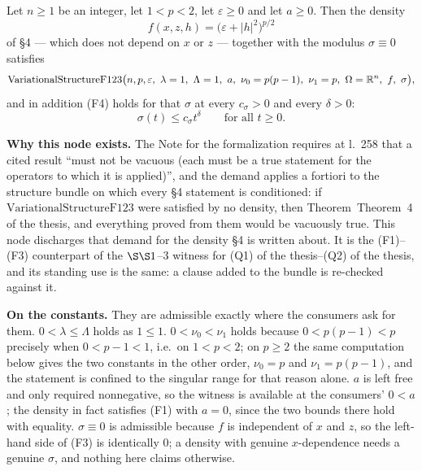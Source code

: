 \begin{lemma}
Let $n\ge1$ be an integer, let $1<p<2$, let $\varepsilon\ge0$ and let $a\ge0$.
Then the density
\[
f(x,z,h)=\bigl(\varepsilon+|h|^2\bigr)^{p/2}
\]
of \S4 --- which does not depend on $x$ or $z$ --- together with the modulus
$\sigma\equiv0$ satisfies
\[
\mathrm{VariationalStructureF123}\bigl(n,p,\varepsilon,\ \lambda=1,\
\Lambda=1,\ a,\ \nu_0=p(p-1),\ \nu_1=p,\ \Omega=\R^n,\ f,\ \sigma\bigr),
\]
and in addition (F4) holds for that $\sigma$ at every $c_\sigma>0$ and every
$\delta>0$:
\[
\sigma(t)\le c_\sigma t^\delta\qquad\text{for all }t\ge0 .
\]

\noindent\textbf{Why this node exists.}  The Note for the formalization requires
at l.~258 that a cited result ``must not be vacuous (each must be a true
statement for the operators to which it is applied)'', and the demand applies a
fortiori to the structure bundle on which every \S4 statement is conditioned: if
$\mathrm{VariationalStructureF123}$ were satisfied by no density, then
Theorem~Theorem~4 of the thesis, \noderef{MinimumGradientHolder} and everything proved from
them would be vacuously true.  This node discharges that demand for the density
\S4 is written about.  It is the (F1)--(F3) counterpart of the $\S\S1$--3
witness for (Q1) of the thesis--(Q2) of the thesis, and its standing use is the same: a
clause added to the bundle is re-checked against it.

\textbf{On the constants.}  They are admissible exactly where the consumers ask
for them.  $0<\lambda\le\Lambda$ holds as $1\le1$.  $0<\nu_0<\nu_1$ holds
because $0<p(p-1)<p$ precisely when $0<p-1<1$, i.e.\ on $1<p<2$; on $p\ge2$ the
same computation below gives the two constants in the other order, $\nu_0=p$ and
$\nu_1=p(p-1)$, and the statement is confined to the singular range for that
reason alone.  $a$ is left free and only required nonnegative, so the witness is
available at the consumers' $0<a$; the density in fact satisfies (F1) with
$a=0$, since the two bounds there hold with equality.  $\sigma\equiv0$ is
admissible because $f$ is independent of $x$ and $z$, so the left-hand side of
(F3) is identically $0$; a density with genuine $x$-dependence needs a genuine
$\sigma$, and nothing here claims otherwise.
\end{lemma}
